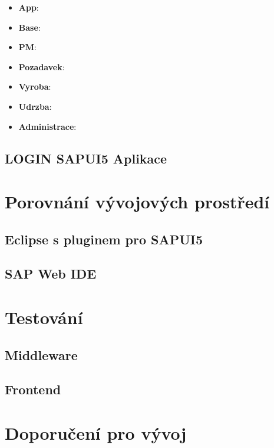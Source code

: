 \documentclass[thesis=M,czech]{FITthesis}[2012/06/26]
\begin{document}
\begin{itemize}
	\item
	\textbf{App}:
	\item
	\textbf{Base}:
	\item
	\textbf{PM}:
	\item
	\textbf{Pozadavek}:
	\item
	\textbf{Vyroba}:
	\item
	\textbf{Udrzba}:
	\item
	\textbf{Administrace}:
\end{itemize} 

\subsection{LOGIN SAPUI5 Aplikace}

\section{Porovnání vývojových prostředí}

\subsection{Eclipse s pluginem pro SAPUI5}

\subsection{SAP Web IDE}

\section{Testování}

\subsection{Middleware}

\subsection{Frontend}

\section{Doporučení pro vývoj}

\begin{conclusion}
\end{conclusion}
\end{document}
